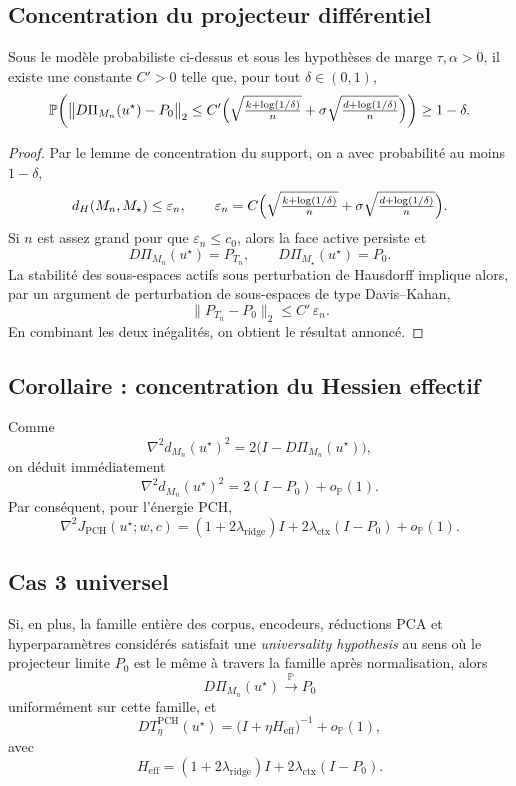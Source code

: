 \subsection{Concentration du projecteur différentiel}

\begin{theorem}
Sous le modèle probabiliste ci-dessus et sous les hypothèses de marge \(\tau,\alpha>0\), il existe une constante \(C'>0\) telle que, pour tout \(\delta\in(0,1)\),
\[
\mathbb P\!\left(
\bigl\|D\Pi_{M_n}(u^\star)-P_0\bigr\|_2
\le
C'\Bigl(
\sqrt{\tfrac{k+\log(1/\delta)}{n}}
+
\sigma\sqrt{\tfrac{d+\log(1/\delta)}{n}}
\Bigr)
\right)\ge 1-\delta.
\]
\end{theorem}

\begin{proof}
Par le lemme de concentration du support, on a avec probabilité au moins \(1-\delta\),
\[
d_H(M_n,M_\star)\le \varepsilon_n,
\qquad
\varepsilon_n=
C\Bigl(
\sqrt{\tfrac{k+\log(1/\delta)}{n}}
+
\sigma\sqrt{\tfrac{d+\log(1/\delta)}{n}}
\Bigr).
\]
Si \(n\) est assez grand pour que \(\varepsilon_n\le c_0\), alors la face active persiste et
\[
D\Pi_{M_n}(u^\star)=P_{T_n},\qquad D\Pi_{M_\star}(u^\star)=P_0.
\]
La stabilité des sous-espaces actifs sous perturbation de Hausdorff implique alors, par un argument de perturbation de sous-espaces de type Davis--Kahan,
\[
\|P_{T_n}-P_0\|_2\le C'\,\varepsilon_n.
\]
En combinant les deux inégalités, on obtient le résultat annoncé.
\end{proof}

\subsection{Corollaire : concentration du Hessien effectif}

Comme
\[
\nabla^2 d_{M_n}(u^\star)^2
=
2\bigl(I-D\Pi_{M_n}(u^\star)\bigr),
\]
on déduit immédiatement
\[
\nabla^2 d_{M_n}(u^\star)^2
=
2(I-P_0)+o_{\mathbb P}(1).
\]
Par conséquent, pour l'énergie PCH,
\[
\nabla^2 J_{\mathrm{PCH}}(u^\star;w,c)
=
(1+2\lambda_{\mathrm{ridge}})I
+
2\lambda_{\mathrm{ctx}}(I-P_0)
+
o_{\mathbb P}(1).
\]

\subsection{Cas 3 universel}

Si, en plus, la famille entière des corpus, encodeurs, réductions PCA et hyperparamètres considérés satisfait une \emph{universality hypothesis} au sens où le projecteur limite \(P_0\) est le même à travers la famille après normalisation, alors
\[
D\Pi_{M_n}(u^\star)\xrightarrow{\mathbb P} P_0
\]
uniformément sur cette famille, et
\[
DT_\eta^{\mathrm{PCH}}(u^\star)
=
\bigl(I+\eta H_{\mathrm{eff}}\bigr)^{-1}
+
o_{\mathbb P}(1),
\]
avec
\[
H_{\mathrm{eff}}
=
(1+2\lambda_{\mathrm{ridge}})I
+
2\lambda_{\mathrm{ctx}}(I-P_0).
\]

